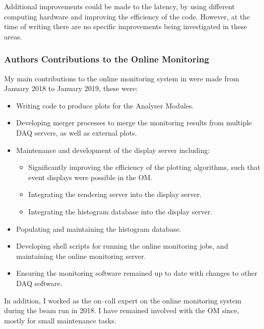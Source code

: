 Additional improvements could be made to the latency, by using different 
computing hardware and improving the efficiency of the code. However, at the 
time of writing there are no specific improvements being investigated in these 
areas.

\subsubsection*{Authors Contributions to the \protodune{} Online Monitoring}
My main contributions to the online monitoring system in \protodune{} were made
from January 2018 to January 2019, these were: 
\begin{itemize}
	\item Writing code to produce plots for the Analyser Modules.
	\item Developing merger processes to merge the monitoring results from
		multiple DAQ servers, as well as external plots.
	\item Maintenance and development of the display server including:
	\begin{itemize}
		\item Significantly improving the efficiency of the plotting algorithms,
			such that event displays were possible in the OM.
		\item Integrating the rendering server into the display server.
		\item Integrating the histogram database into the display server.
	\end{itemize}
	\item Populating and maintaining the histogram database.
	\item Developing shell scripts for running the online monitoring jobs, and
		maintaining the online monitoring server.
	\item Ensuring the monitoring software remained up to date with changes to
		other DAQ software.
\end{itemize}
In addition, I worked as the on--call expert on the online monitoring system
during the \protodune{} beam run in 2018. I have remained involved with the OM 
since, mostly for small maintenance tasks. 

